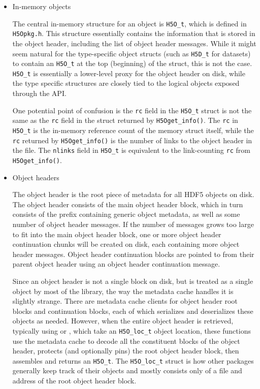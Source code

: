 \begin{itemize}
    \item In-memory objects

The central in-memory structure for an object is \texttt{H5O\_t}, which is defined in \texttt{H5Opkg.h}. This structure essentially contains the information that is stored in the object header, including the list of object header messages. While it might seem natural for the type-specific object structs (such as \texttt{H5D\_t} for datasets) to contain an \texttt{H5O\_t} at the top (beginning) of the struct, this is not the case. \texttt{H5O\_t} is essentially a lower-level proxy for the object header on disk, while the type specific structures are closely tied to the logical objects exposed through the API.

One potential point of confusion is the \texttt{rc} field in the \texttt{H5O\_t} struct is not the same as the \texttt{rc} field in the struct returned by \texttt{H5Oget\_info()}. The \texttt{rc} in \texttt{H5O\_t} is the in-memory reference count of the memory struct itself, while the \texttt{rc} returned by \texttt{H5Oget\_info()} is the number of links to the object header in the file. The \texttt{nlinks} field in \texttt{H5O\_t} is equivalent to the link-counting \texttt{rc} from \texttt{H5Oget\_info()}.

    \item Object headers

The object header is the root piece of metadata for all HDF5 objects on disk. The object header consists of the main object header block, which in turn consists of the prefix containing generic object metadata, as well as some number of object header messages. If the number of messages grows too large to fit into the main object header block, one or more object header continuation chunks will be created on disk, each containing more object header messages. Object header continuation blocks are pointed to from their parent object header using an object header continuation message.

Since an object header is not a single block on disk, but is treated as a single object by most of the library, the way the metadata cache handles it is slightly strange. There are metadata cache clients for object header root blocks and continuation blocks, each of which serializes and deserializes these objects as needed. However, when the entire object header is retrieved, typically using  or , which take an \texttt{H5O\_loc\_t} object location, these functions use the metadata cache to decode all the constituent blocks of the object header, protects (and optionally pins) the root object header block, then assembles and returns an \texttt{H5O\_t}. The \texttt{H5O\_loc\_t} struct is how other packages generally keep track of their objects and mostly consists only of a file and address of the root object header block.


\end{itemize}

